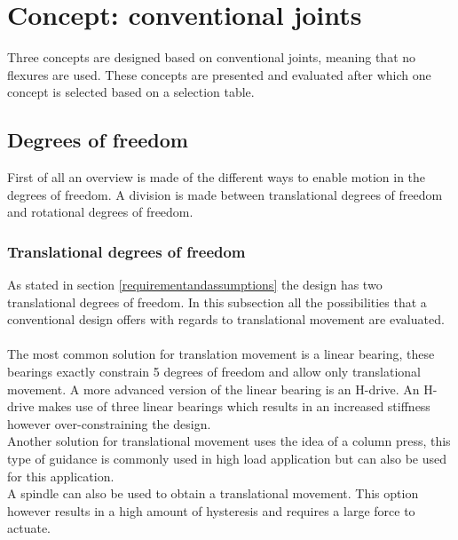 \section{Concept: conventional joints}
\label{Concept: conventional joints}
Three concepts are designed based on conventional joints, meaning that no flexures are used. These concepts are presented and evaluated after which one concept is selected based on a selection table.


\subsection{Degrees of freedom}
First of all an overview is made of the different ways to enable motion in the degrees of freedom. A division is made between translational degrees of freedom and rotational degrees of freedom.
\subsubsection{Translational degrees of freedom}
As stated in section \ref{requirementandassumptions} the design has two translational degrees of freedom. In this subsection all the possibilities that a conventional design offers with regards to translational movement are evaluated. \\\\
The most common solution for translation movement is a linear bearing, these bearings exactly constrain 5 degrees of freedom and allow only translational movement. A more advanced version of the linear bearing is an H-drive. An H-drive makes use of three linear bearings which results in an increased stiffness however over-constraining the design.  \\
Another solution for translational movement uses the idea of a column press, this type of guidance is commonly used in high load application but can also be used for this application. \\
A spindle can also be used to obtain a translational movement. This option however results in a high amount of hysteresis and requires a large force to actuate. 


